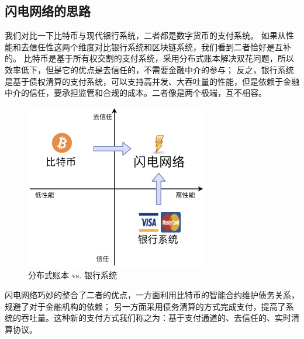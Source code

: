\subsection{闪电网络的思路}
我们对比一下比特币与现代银行系统，二者都是数字货币的支付系统。
如果从性能和去信任性这两个维度对比银行系统和区块链系统，我们看到二者恰好是互补的。
比特币是基于所有权交割的支付系统，采用分布式账本解决双花问题，所以效率低下，但是它的优点是去信任的，不需要金融中介的参与；
反之，银行系统是基于债权清算的支付系统，可以支持高并发、大吞吐量的性能，但是依赖于金融中介的信任，要承担监管和合规的成本。二者像是两个极端，互不相容。

\begin{figure}[h!]
    \centering
    \includegraphics[width=8cm, keepaspectratio]{../images/comparision.png}
    \caption{分布式账本 vs. 银行系统}
    \label{fig:comparition}
\end{figure}

闪电网络巧妙的整合了二者的优点，一方面利用比特币的智能合约维护债务关系，规避了对于金融机构的依赖；
另一方面采用债务清算的方式完成支付，提高了系统的吞吐量。这种新的支付方式我们称之为：基于支付通道的、去信任的、实时清算协议。
